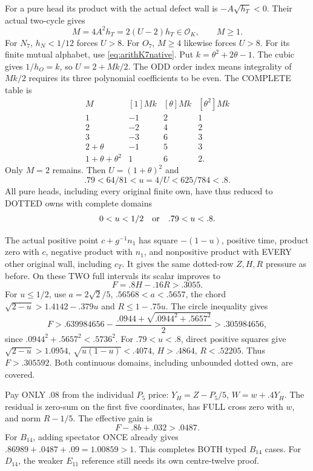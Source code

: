 \documentclass[11pt]{article}
\begin{document}
For a pure head its product with the actual defect
wall is \(-A\sqrt{h_T}<0\).
Their actual two-cycle gives
\[
              M=4A^2h_T=2(U-2)h_T\in\mathcal O_K,\qquad M\ge1 .
\]
For \(N_7\), \(h_N<1/12\) forces \(U>8\).
For \(O_7\), \(M\ge4\) likewise forces \(U>8\).
For its finite mutual alphabet, use
\eqref{eq:arithK7native}.
Put \(k=\theta^2+2\theta-1\).
The cubic gives \(1/h_O=k\), so \(U=2+Mk/2\).
The ODD order index means integrality of \(Mk/2\)
requires its three polynomial coefficients to be even.
The COMPLETE table is
\[
\begin{array}{c|rrr}
 M&[1]Mk&[\theta]Mk&[\theta^2]Mk\\ \hline
 1&-1&2&1\\
 2&-2&4&2\\
 3&-3&6&3\\
 2+\theta&-1&5&3\\
 1+\theta+\theta^2&1&6&2 .
\end{array}
\]
Only \(M=2\) remains.
Then \(U=(1+\theta)^2\) and
\[
             .79<64/81<u=4/U<625/784<.8 .
\]
All pure heads, including every original finite own,
have thus reduced to DOTTED owns with complete domains
\[
                            0<u<1/2
                   \quad\hbox{or}\quad .79<u<.8 .
\]

The actual positive point \(c+g^{-1}n_1\) has square
\(-(1-u)\), positive time, product zero with \(c\),
negative product with \(n_1\), and nonpositive product
with EVERY other original wall, including \(c_T\).
It gives the same dotted-row \(Z,H,R\) pressure as before.
On these TWO full intervals its scalar improves to
\[
                             F=.8H-.16R>.3055 .
\]
For \(u\le1/2\), use \(a=2\sqrt2/5\),
\(.56568<a<.5657\), the chord
\(\sqrt{2-u}>1.4142-.379u\) and \(R\le1-.75u\).
The circle inequality gives
\[
 F>.639984656-
       {\frac{\, .0944+\sqrt{.0944^2+.5657^2}}{2}}
       >.305984656,
\]
since \(.0944^2+.5657^2<.5736^2\).
For \(.79<u<.8\), direct positive squares give
\(\sqrt{2-u}>1.0954\),
\(\sqrt{u(1-u)}<.4074\),
\(H>.4864\), \(R<.52205\).
Thus \(F>.305592\).
Both continuous domains, including unbounded dotted
own, are covered.

Pay ONLY \(.08\) from the individual \(P_5\) price:
\(Y_H=Z-P_5/5\), \(W=w+.4Y_H\).
The residual is zero-sum on the first five coordinates,
has FULL cross zero with \(w\), and norm \(R-1/5\).
The effective gain is
\[
                        F-.8b+.032>.0487 .
\tag{TG}\label{eq:arithBD14typedgain}
\]
For \(B_{14}\), adding spectator ONCE already gives
\(.86989+.0487+.09=1.00859>1\).
This completes BOTH typed \(B_{14}\) cases.
For \(D_{14}\), the weaker \(E_{11}\) reference
still needs its own centre-twelve proof.
\end{document}
